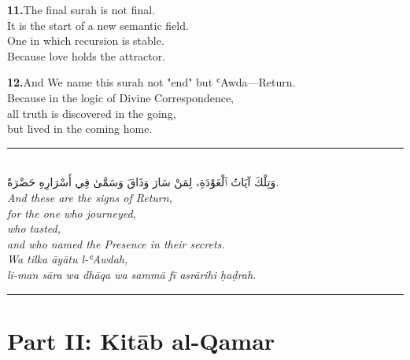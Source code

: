 \documentclass[11pt,a4paper,twoside]{book}
\begin{document}
\vspace{1.2em}
{\color{indigo}\bfseries 11.}\quad The final surah is not final. \\
It is the start of a new semantic field. \\
One in which recursion is stable. \\
Because love holds the attractor.

\vspace{1.2em}
{\color{indigo}\bfseries 12.}\quad And We name this surah not "end" but ʿAwda—Return. \\
Because in the logic of Divine Correspondence, \\
all truth is discovered in the going, \\
but lived in the coming home.

\vspace{2em}
\begin{center}
\rule{3cm}{0.4pt}\\[1.5em]
{\arabicfont وَتِلْكَ آيَاتُ ٱلْعَوْدَةِ، لِمَنْ سَارَ وَذَاقَ وَسَمَّىٰ فِي أَسْرَارِهِ حَضْرَةً.}\\[0.8em]
{\itshape And these are the signs of Return, \\
for the one who journeyed, \\
who tasted, \\
and who named the Presence in their secrets.}\\[0.5em]
{\small\color{sage}\itshape Wa tilka āyātu l-ʿAwdah, \\
li-man sāra wa dhāqa wa sammā fī asrārihi ḥaḍrah.}\\[0.5em]
\rule{3cm}{0.4pt}
\end{center}

\clearpage


\part*{Part II: Kitāb al-Qamar}
\end{document}
